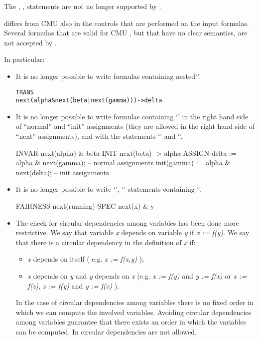 The , ,  statements are not
no longer supported by \nusmv.

\nusmv differs from CMU \smv also in the controls that are performed
on the input formulas. 
%
Several formulas that are valid for CMU \smv, but that have no clear
semantics, are not accepted by \nusmv. 

In particular:

\begin{itemize}

\item It is no longer possible to write formulas containing
      nested`'.
\begin{alltt}
TRANS
  next(alpha & next(beta | next(gamma))) -> delta
\end{alltt}

\item It is no longer possible to write formulas containing
      `' in the right hand side of ``normal'' and ``init''
      assignments (they are allowed in the right hand side of ``next''
      assignments), and with the statements `' and
      `'.

\begin{nusmvCode}
INVAR
  next(alpha) & beta
INIT
  next(beta) -> alpha
ASSIGN
  delta := alpha & next(gamma);       -- normal assignments
  init(gamma) := alpha & next(delta); -- init assignments
\end{nusmvCode}

\item It is no longer possible to write `',
      `' statements containing `'.

\begin{nusmvCode}
FAIRNESS
 next(running)
SPEC
 next(x) & y
\end{nusmvCode}

\item The check for circular dependencies among variables has been 
      done more restrictive.  We say that variable \textit{x} depends on
      variable \textit{y} if \textit{x := f(y)}.  We say that there is a
      circular dependency in the definition of \textit{x} if:

\begin{itemize}
  \item  \textit{x} depends on itself ( e.g. \textit{x := f(x,y)} );
  \item \textit{x} depends on \textit{y} and \textit{y} depends on
        \textit{x} (e.g. \textit{x := f(y)} and \textit{y := f(x)} or
        \textit{x := f(z)}, \textit{z := f(y)} and \textit{y := f(x)} ).
\end{itemize}
%
In the case of circular dependencies among variables there is no fixed
order in which we can compute the involved variables. Avoiding
circular dependencies among variables guarantee that there exists an
order in which the variables can be computed. In \nusmv circular
dependencies are not allowed.


\end{itemize}
